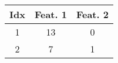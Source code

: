 \documentclass{standalone}
\begin{document}
	\begin{tabular}{ccc}
		\toprule
		Idx & Feat. 1 & Feat. 2\\
		\midrule
		\rowcolor{CBOne}
		1 & 13 & 0  \\
		\rowcolor{CBTwo}
		2 & 7 & 1 \\
		\bottomrule
	\end{tabular}
\end{document}
